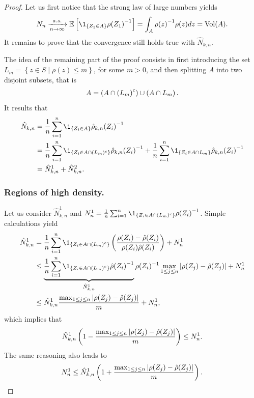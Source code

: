 \documentclass[twoside]{article}
\theoremstyle{definition}
\theoremstyle{remark}
\newcommand{\kvv}{z} %
\newcommand{\KVV}{Z} %
\newcommand{\acc}[1]{\left\{ #1 \right\}}
\begin{document}
\begin{proof}
Let us first notice that the strong law of large numbers yields 
\begin{align}\label{eq.almost.sure.CV.Nn}
    N_n \xra[a.s.]{n\to\infty} \E\bra{\1_{\set{\KVV_1\in A}}{\rho(\KVV_1)}^{-1}} =  \int_A {{\rho(\kvv)}^{-1}} {\rho(\kvv)} d\kvv = \Vol(A) .
\end{align}
%
It remains to prove that the convergence still holds true with $\hat{N}_{k,n}$.

The idea of the remaining part of the proof consists in first introducing the set $L_m = \acc{z\in S \mid \rho(z) \leq m}$, for some $m>0$, and then splitting $A$ into two disjoint subsets, that is 
\begin{align*}
    A = \left(A\cap \left(L_m\right)^c\right) \cup \left(A\cap L_m\right).
\end{align*}
It results that
\begin{align*}
    \hat{N}_{k,n}  & = \frac{1}{n} \sum_{i=1}^n\1_{\set{\KVV_i\in A}}{\hat{\rho}_{k,n}(\KVV_i)}^{-1} \\
    & = \frac{1}{n} \sum_{i=1}^n\1_{\set{\KVV_i\in A\cap (L_m)^c}}{\hat{\rho}_{k,n}(\KVV_i)}^{-1} + \frac{1}{n} \sum_{i=1}^n\1_{\set{\KVV_i\in A \cap L_m}}{\hat{\rho}_{k,n}(\KVV_i)}^{-1} \\
    & = \hat{N}_{k,n}^1 + \hat{N}_{k,n}^2.
\end{align*}







\subsubsection*{Regions of high density.}
%
Let us consider $\hat{N}_{k,n}^1$ and $N_n^1 =\frac{1}{n} \sum_{i=1}^n\1_{\set{\KVV_i\in A\cap (L_m)^c}}{\rho(\KVV_i)}^{-1} $.
%
Simple calculations yield
\begin{align*}
    \hat{N}_{k,n}^1  & = \frac{1}{n} \sum_{i=1}^n \1_{\set{\KVV_i\in A\cap \pa{L_m}^c}} \pa{\frac{\rho(\KVV_i) - {\hat{\rho}(\KVV_i)}}{\rho(\KVV_i)\hat{\rho}(\KVV_i)}} + N_n^1 \\
     &\leq \underbrace{\frac{1}{n} \sum_{i=1}^n \1_{\set{\KVV_i\in A\cap \pa{L_m}^c}} {\hat{\rho}(\KVV_i)}^{-1}}_{\hat{N}_{k,n}^1} \rho(\KVV_i)^{-1} \max_{1\leq j\leq n} \abs{\rho(\KVV_j) - {\hat{\rho}(\KVV_j)}}  + N_n^1  \\
     &\leq \hat{N}_{k,n}^1 \frac{ \max_{1\leq j\leq n} \abs{\rho(\KVV_j) - {\hat{\rho}(\KVV_j)}} }{m}   + N_n^1  ,
\end{align*}
which implies that
\begin{align*}
\hat{N}_{k,n}^1\pa{1 - \frac{ \max_{1\leq j\leq n} \abs{\rho(\KVV_j) - {\hat{\rho}(\KVV_j)}} }{m} } \leq  N_n^1 .
\end{align*}    
%
The same reasoning also leads to
\begin{align*}
N_n^1 \leq 	\hat{N}_{k,n}^1\pa{1 + \frac{ \max_{1\leq j\leq n} \abs{\rho(\KVV_j) - {\hat{\rho}(\KVV_j)}} }{m}  } .    
\end{align*}




\end{proof}
\end{document}
